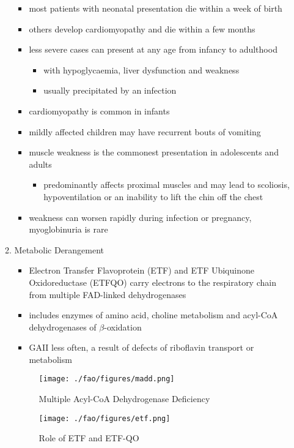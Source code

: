 \documentclass{scrartcl}
\begin{document}
\begin{enumerate}
\begin{enumerate}
\begin{itemize}
\item most patients with neonatal presentation die within a week of birth
\item others develop cardiomyopathy and die within a few months
\item less severe cases can present at any age from infancy to adulthood
\begin{itemize}
\item with hypoglycaemia, liver dysfunction and weakness
\item usually precipitated by an infection
\end{itemize}
\item cardiomyopathy is common in infants
\item mildly affected children may have recurrent bouts of vomiting
\item muscle weakness is the commonest presentation in adolescents and adults
\begin{itemize}
\item predominantly affects proximal muscles and may lead to scoliosis,
hypoventilation or an inability to lift the chin off the chest
\end{itemize}
\item weakness can worsen rapidly during infection or pregnancy, myoglobinuria is rare
\end{itemize}

\item Metabolic Derangement
\label{sec:orgd8d581d}
\begin{itemize}
\item Electron Transfer Flavoprotein (ETF) and ETF Ubiquinone
Oxidoreductase (ETFQO) carry electrons to the respiratory chain from
multiple FAD-linked dehydrogenases
\item includes enzymes of amino acid, choline metabolism and acyl-CoA
dehydrogenases of \(\beta\)-oxidation
\item GAII less often, a result of defects of riboflavin transport or
metabolism
\end{itemize}

\begin{figure}[htbp]
\centering
\texttt{[image: ./fao/figures/madd.png]}
\caption{\label{fig:orgba7518b}
Multiple Acyl-CoA Dehydrogenase Deficiency}
\end{figure}

\begin{figure}[htbp]
\centering
\texttt{[image: ./fao/figures/etf.png]}
\caption{\label{fig:org5cf2b1f}
Role of ETF and ETF-QO}
\end{figure}


\end{enumerate}
\end{enumerate}
\end{document}
